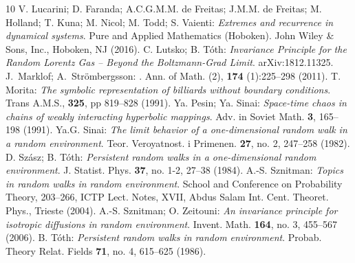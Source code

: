 \begin{thebibliography}{10}
 V. Lucarini; D. Faranda; A.C.G.M.M. de Freitas; J.M.M. de Freitas; M. Holland; T. Kuna; M. Nicol; M. Todd; S. Vaienti: {\em Extremes and recurrence in dynamical systems}. Pure and Applied Mathematics (Hoboken). John Wiley \& Sons, Inc., Hoboken, NJ (2016).
 C. Lutsko; B. T\'oth: {\em Invariance Principle for the Random Lorentz Gas -- Beyond the Boltzmann-Grad Limit}. 
arXiv:1812.11325.
J.~Marklof; A.~Str{\"o}mbergsson:
.
\newblock Ann. of Math. (2), {\bf 174} (1):225--298 (2011).
 T. Morita: {\em The symbolic representation of billiards without boundary conditions}.
Trans A.M.S., {\bf 325}, pp 819--828 (1991).
 Ya. Pesin; Ya. Sinai: {\em Space-time chaos in chains of weakly interacting hyperbolic mappings}. Adv. in Soviet Math. {\bf 3}, 165--198 (1991).
  Ya.G. Sinai: {\em The limit behavior of a one-dimensional random walk in a random environment}.
Teor. Veroyatnost. i Primenen. {\bf 27}, no. 2, 247--258  (1982).
 D. Sz\'asz; B. T\'oth: {\em Persistent random walks in a one-dimensional random environment}. J. Statist. Phys. {\bf 37}, no. 1-2, 27--38  (1984).
A.-S. Sznitman: {\em Topics in random walks in random environment}. School and Conference on Probability Theory, 203--266, ICTP Lect. Notes, XVII, Abdus Salam Int. Cent. Theoret. Phys., Trieste (2004). 
A.-S. Sznitman; O. Zeitouni: {\em An invariance principle for isotropic diffusions in random environment}. Invent. Math. {\bf 164}, no. 3, 455--567  (2006).
 B. T\'oth: {\em  Persistent random walks in random environment}. Probab. Theory Relat. Fields {\bf 71}, no. 4, 615--625  (1986).

\end{thebibliography}

